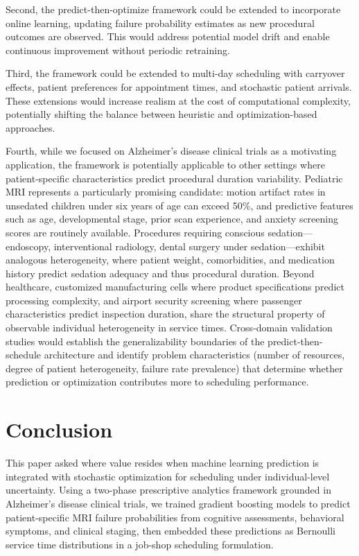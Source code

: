 \documentclass[msom,blindrev]{informs3}
\begin{document}
Second, the predict-then-optimize framework could be extended to incorporate online learning, updating failure probability estimates as new procedural outcomes are observed. This would address potential model drift and enable continuous improvement without periodic retraining.

Third, the framework could be extended to multi-day scheduling with carryover effects, patient preferences for appointment times, and stochastic patient arrivals. These extensions would increase realism at the cost of computational complexity, potentially shifting the balance between heuristic and optimization-based approaches.

Fourth, while we focused on Alzheimer's disease clinical trials as a motivating application, the framework is potentially applicable to other settings where patient-specific characteristics predict procedural duration variability. Pediatric MRI represents a particularly promising candidate: motion artifact rates in unsedated children under six years of age can exceed 50\%, and predictive features such as age, developmental stage, prior scan experience, and anxiety screening scores are routinely available. Procedures requiring conscious sedation---endoscopy, interventional radiology, dental surgery under sedation---exhibit analogous heterogeneity, where patient weight, comorbidities, and medication history predict sedation adequacy and thus procedural duration. Beyond healthcare, customized manufacturing cells where product specifications predict processing complexity, and airport security screening where passenger characteristics predict inspection duration, share the structural property of observable individual heterogeneity in service times. Cross-domain validation studies would establish the generalizability boundaries of the predict-then-schedule architecture and identify problem characteristics (number of resources, degree of patient heterogeneity, failure rate prevalence) that determine whether prediction or optimization contributes more to scheduling performance.



\section{Conclusion}
\label{sec:conclusion}

This paper asked where value resides when machine learning prediction is integrated with stochastic optimization for scheduling under individual-level uncertainty. Using a two-phase prescriptive analytics framework grounded in Alzheimer's disease clinical trials, we trained gradient boosting models to predict patient-specific MRI failure probabilities from cognitive assessments, behavioral symptoms, and clinical staging, then embedded these predictions as Bernoulli service time distributions in a job-shop scheduling formulation.
\end{document}
